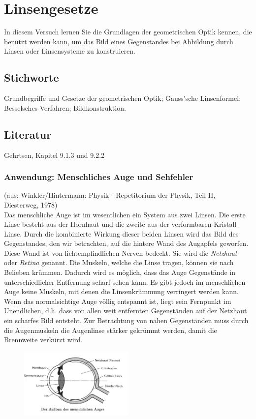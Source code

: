 \chapter{Linsengesetze}
\label{v:7}

In diesem Versuch lernen Sie die Grundlagen der geometrischen Optik kennen, die benutzt werden kann, um das Bild eines Gegenstandes bei Abbildung durch Linsen oder Linsensysteme zu konstruieren.

\section{Stichworte}
Grundbegriffe und Gesetze der geometrischen Optik; Gauss'sche Linsenformel; Besselsches Verfahren; Bildkonstruktion.
%
\section{Literatur}
Gehrtsen, Kapitel 9.1.3 und 9.2.2
%

\subsection{Anwendung: Menschliches Auge und Sehfehler}

(aus: Winkler/Hintermann: Physik - Repetitorium der Physik, Teil II, Diesterweg, 1978)\\

\noindent
Das menschliche Auge ist im wesentlichen ein System aus zwei Linsen. Die erste Linse besteht aus der Hornhaut und die zweite aus der verformbaren Kristall-Linse. Durch die kombinierte Wirkung dieser beiden Linsen wird das Bild des Gegenstandes, den wir betrachten, auf die hintere Wand des Augapfels geworfen. Diese Wand ist von lichtempfindlichen Nerven bedeckt. Sie wird die \textit{Netzhaut} oder \textit{Retina} genannt. Die Muskeln, welche die Linse tragen, können sie nach Belieben krümmen. Dadurch wird es möglich, dass das Auge Gegenstände in unterschiedlicher Entfernung scharf sehen kann. Es gibt jedoch im menschlichen Auge keine Muskeln, mit denen die Linsenkrümmung verringert werden kann. Wenn das normalsichtige Auge völlig entspannt ist, liegt sein Fernpunkt im Unendlichen, d.h. dass von allen weit entfernten Gegenständen auf der Netzhaut ein scharfes Bild entsteht. Zur Betrachtung von nahen Gegenständen muss durch die Augenmuskeln die Augenlinse stärker gekrümmt werden, damit die Brennweite verkürzt 
wird.
\begin{figure}[h]
	\centering
		\includegraphics[width=0.5\textwidth]{Abbildungen/auge.jpg}
	\label{fig:auge}
\end{figure}

